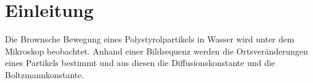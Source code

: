 \section*{Einleitung}

Die Brownsche Bewegung eines Polystyrolpartikels in Wasser wird unter dem Mikroskop beobachtet. Anhand einer Bildsequenz werden die Ortsveränderungen eines Partikels bestimmt und aus diesen die Diffusionskonstante und die Boltzmannkonstante.
